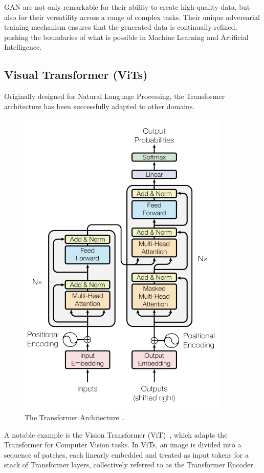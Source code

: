 \documentclass[12pt,a4paper]{report}
\begin{document}
GAN are not only remarkable for their ability to create high-quality data, but also for their versatility across a range of complex tasks. Their unique adversarial training mechanism ensures that the generated data is continually refined, pushing the boundaries of what is possible in Machine Learning and Artificial Intelligence.

\subsection{Visual Transformer (ViTs)}

Originally designed for Natural Language Processing, the Transformer~\cite{vaswani2017attention} architecture has been successfully adapted to other domains.

\begin{figure}[th]
  \centering
  \includegraphics[scale=0.85]{./pics/transformer.png}
  \caption[The Transformer Architecture]{The Transformer Architecture~\cite{vaswani2017attention}.}
  \label{fig:pi7}
\end{figure}

A notable example is the Vision Transformer (ViT)~\cite{dosovitskiy2020}, which adapts the Transformer for Computer Vision tasks. In ViTs, an image is divided into a sequence of patches, each linearly embedded and treated as input tokens for a stack of Transformer layers, collectively referred to as the Transformer Encoder.
\end{document}
